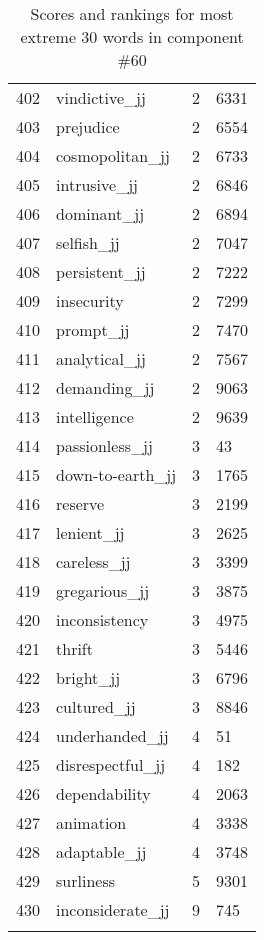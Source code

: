 \begin{longtable}[!htbp]{| rlr@{.}l |}
    402 & vindictive\_jj & 2 & 6331 \\
    403 & prejudice & 2 & 6554 \\
    404 & cosmopolitan\_jj & 2 & 6733 \\
    405 & intrusive\_jj & 2 & 6846 \\
    406 & dominant\_jj & 2 & 6894 \\
    407 & selfish\_jj & 2 & 7047 \\
    408 & persistent\_jj & 2 & 7222 \\
    409 & insecurity & 2 & 7299 \\
    410 & prompt\_jj & 2 & 7470 \\
    411 & analytical\_jj & 2 & 7567 \\
    412 & demanding\_jj & 2 & 9063 \\
    413 & intelligence & 2 & 9639 \\
    414 & passionless\_jj & 3 & 43 \\
    415 & down-to-earth\_jj & 3 & 1765 \\
    416 & reserve & 3 & 2199 \\
    417 & lenient\_jj & 3 & 2625 \\
    418 & careless\_jj & 3 & 3399 \\
    419 & gregarious\_jj & 3 & 3875 \\
    420 & inconsistency & 3 & 4975 \\
    421 & thrift & 3 & 5446 \\
    422 & bright\_jj & 3 & 6796 \\
    423 & cultured\_jj & 3 & 8846 \\
    424 & underhanded\_jj & 4 & 51 \\
    425 & disrespectful\_jj & 4 & 182 \\
    426 & dependability & 4 & 2063 \\
    427 & animation & 4 & 3338 \\
    428 & adaptable\_jj & 4 & 3748 \\
    429 & surliness & 5 & 9301 \\
    430 & inconsiderate\_jj & 9 & 745 \\
    \hline
    \caption{Scores and rankings for most extreme 30 words in component \#60} \\
\end{longtable}
